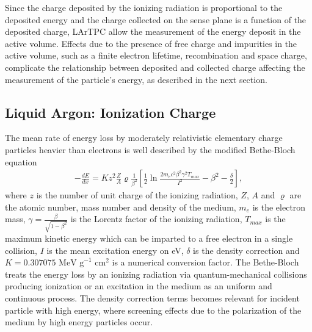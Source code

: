 Since the charge deposited by the ionizing radiation is proportional to the deposited energy and the charge collected on the sense plane is a function of the deposited charge, LArTPC allow the measurement of the energy deposit in the active volume. Effects due to the presence of free charge and impurities in the active volume, such as a finite electron lifetime, recombination and space charge, complicate the relationship between deposited and collected charge affecting the measurement of the particle's energy, as described in the next section.
 
\subsection{Liquid Argon: Ionization Charge}\label{sec:charge}
The mean rate of energy loss by moderately relativistic elementary charge particles heavier than electrons is well described by the modified Bethe-Bloch \cite{Patrignani:2016xqp} equation
\begin{eqnarray}
			- \frac{dE}{dx} = K z^2 \frac{Z}{A} \varrho \frac{1}{\beta^2} \left[ \frac{1}{2} \ln{\frac{2 m_e c^2 \beta^2 \gamma^2 T_{max}}{I^2}} - \beta^2 - \frac{\delta}{2}\right] ,
			\label{eq:BB}
\end{eqnarray}
where  $z$ is the number of unit charge of the ionizing radiation, $Z$, $A$  and $\varrho$ are the atomic number, mass number and density of the medium,  $m_e$  is the electron mass, $\gamma = \frac{\beta}{\sqrt{1-\beta^2}} $ is the Lorentz factor of the ionizing radiation,  $T_{max}$ is the maximum kinetic energy which can be
imparted to a free electron in a single collision, $I$ is the mean excitation energy on eV,  $\delta$ is the  density correction and $K = 0.307 075 \text{ MeV g}^{-1}\text{ cm}^2$ is a numerical conversion factor. The Bethe-Bloch treats the energy loss by an ionizing radiation via quantum-mechanical collisions producing ionization or an excitation in the medium as an uniform and continuous process. The density correction  terms becomes relevant for incident particle with high energy, where screening effects due to the polarization of the medium by high energy particles occur.


